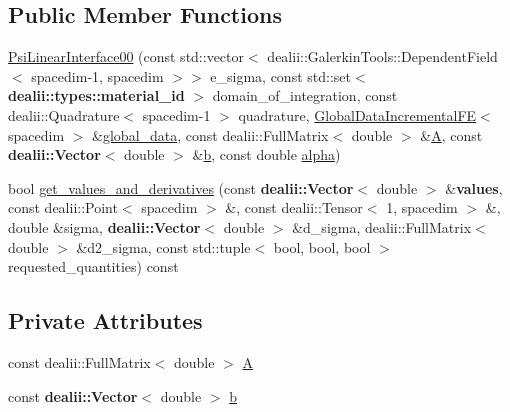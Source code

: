 \subsection*{Public Member Functions}
\begin{DoxyCompactItemize}
\item 
\hyperlink{classincremental_f_e_1_1_psi_linear_interface00_a0044414c2ebe5dd31faae421ec5f6383}{Psi\+Linear\+Interface00} (const std\+::vector$<$ dealii\+::\+Galerkin\+Tools\+::\+Dependent\+Field$<$ spacedim-\/1, spacedim $>$$>$ e\+\_\+sigma, const std\+::set$<$ {\bf dealii\+::types\+::material\+\_\+id} $>$ domain\+\_\+of\+\_\+integration, const dealii\+::\+Quadrature$<$ spacedim-\/1 $>$ quadrature, \hyperlink{classincremental_f_e_1_1_global_data_incremental_f_e}{Global\+Data\+Incremental\+FE}$<$ spacedim $>$ \&\hyperlink{classincremental_f_e_1_1_psi_ae77b2e13385734b19d6ee445c477a6eb}{global\+\_\+data}, const dealii\+::\+Full\+Matrix$<$ double $>$ \&\hyperlink{classincremental_f_e_1_1_psi_linear_interface00_a58c4e916fb9d722b16963e213235ed81}{A}, const {\bf dealii\+::\+Vector}$<$ double $>$ \&\hyperlink{classincremental_f_e_1_1_psi_linear_interface00_a67da23f105ba3e30884099c71c972b56}{b}, const double \hyperlink{classincremental_f_e_1_1_psi_a0d59fde4728962fa75449a3444341dcf}{alpha})
\item 
bool \hyperlink{classincremental_f_e_1_1_psi_linear_interface00_afd49f47bcebe274d4d96bd2fa9d83d15}{get\+\_\+values\+\_\+and\+\_\+derivatives} (const {\bf dealii\+::\+Vector}$<$ double $>$ \&{\bf values}, const dealii\+::\+Point$<$ spacedim $>$ \&, const dealii\+::\+Tensor$<$ 1, spacedim $>$ \&, double \&sigma, {\bf dealii\+::\+Vector}$<$ double $>$ \&d\+\_\+sigma, dealii\+::\+Full\+Matrix$<$ double $>$ \&d2\+\_\+sigma, const std\+::tuple$<$ bool, bool, bool $>$ requested\+\_\+quantities) const 
\end{DoxyCompactItemize}
\subsection*{Private Attributes}
\begin{DoxyCompactItemize}
\item 
const dealii\+::\+Full\+Matrix$<$ double $>$ \hyperlink{classincremental_f_e_1_1_psi_linear_interface00_a58c4e916fb9d722b16963e213235ed81}{A}
\item 
const {\bf dealii\+::\+Vector}$<$ double $>$ \hyperlink{classincremental_f_e_1_1_psi_linear_interface00_a67da23f105ba3e30884099c71c972b56}{b}
\end{DoxyCompactItemize}


